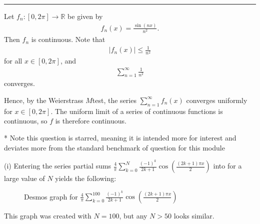 \documentclass[letterpaper,10pt,english]{jupyterBook}
\let\sphinxpxdimen\pdfpxdimen\else\newdimen\sphinxpxdimen
\begin{document}
\bigskip\hrule\bigskip


\sphinxAtStartPar
{\hyperref[\detokenize{Problems:id64}]{}}
Let \(f_n:[0,2\pi]\to\mathbb{R}\) be given by
\begin{equation*}
\begin{split}
f_n (x) = \frac{\sin (nx )}{n^2}.
\end{split}
\end{equation*}
\sphinxAtStartPar
Then \(f_n\) is continuous. Note that
\begin{equation*}
\begin{split}
|f_n (x )| \leq  \frac{1}{n^2}
\end{split}
\end{equation*}
\sphinxAtStartPar
for all \(x \in [0,2\pi]\), and
\begin{equation*}
\begin{split}
\sum_{n=1}^\infty \frac{1}{n^2}
\end{split}
\end{equation*}
\sphinxAtStartPar
converges.

\sphinxAtStartPar
Hence, by the Weierstrass \(M\)\sphinxhyphen{}test, the series \(\sum_{n=1}^\infty f_n (x )\) converges uniformly for \(x \in [0,2\pi]\). The uniform limit of a series of continuous functions is continuous, so \(f\) is therefore continuous.

\label{\detokenize{Solutions-full:id1}}
\sphinxAtStartPar
{\hyperref[\detokenize{Problems:id65}]{}}* Note this question is starred, meaning it is intended more for interest and deviates more from the standard benchmark of question for this module

\sphinxAtStartPar
(i) Entering the series partial sums \(\frac{4}{\pi}\sum_{k=0}^N\frac{(-1)^k}{2k+1}\cos\left(\frac{(2k+1)\pi x}{2}\right)\) into  for a large value of \(N\) yields the following:

\begin{figure}[htbp]
\centering
\capstart

\noindent\sphinxincludegraphics[width=400\sphinxpxdimen]{{fourier1}.png}
\caption{Desmos graph for \(\frac{4}{\pi}\sum_{k=0}^100\frac{(-1)^k}{2k+1}\cos\left(\frac{(2k+1)\pi x}{2}\right)\)}\label{\detokenize{Solutions-full:fourier1}}\end{figure}

\sphinxAtStartPar
This graph was created with \(N=100\), but any \(N>50\) looks similar.
\end{document}
